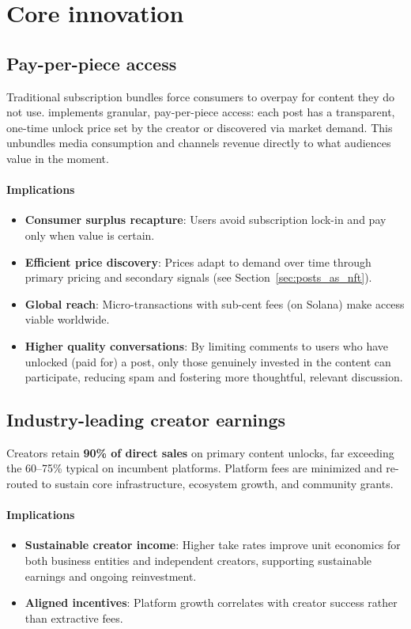 \documentclass[10pt]{article}
\begin{document}
  \section{Core innovation}
    \subsection{Pay-per-piece access}
      Traditional subscription bundles force consumers to overpay for content they do not use. \textbf{\projectname{}} implements granular, pay-per-piece access: each post has a transparent, one-time unlock price set by the creator or discovered via market demand. This unbundles media consumption and channels revenue directly to what audiences value in the moment.

      \paragraph{Implications}
        \begin{itemize}[leftmargin=*]
          \item \textbf{Consumer surplus recapture}: Users avoid subscription lock-in and pay only when value is certain.
          \item \textbf{Efficient price discovery}: Prices adapt to demand over time through primary pricing and secondary signals (see Section~\ref{sec:posts_as_nft}).
          \item \textbf{Global reach}: Micro-transactions with sub-cent fees (on Solana) make access viable worldwide.
          \item \textbf{Higher quality conversations}: By limiting comments to users who have unlocked (paid for) a post, only those genuinely invested in the content can participate, reducing spam and fostering more thoughtful, relevant discussion.
        \end{itemize}

    \subsection{Industry-leading creator earnings}
      Creators retain \textbf{90\% of direct sales} on primary content unlocks, far exceeding the 60--75\% typical on incumbent platforms. Platform fees are minimized and re-routed to sustain core infrastructure, ecosystem growth, and community grants.

      \paragraph{Implications}
        \begin{itemize}[leftmargin=*]
          \item \textbf{Sustainable creator income}: Higher take rates improve unit economics for both business entities and independent creators, supporting sustainable earnings and ongoing reinvestment.
          \item \textbf{Aligned incentives}: Platform growth correlates with creator success rather than extractive fees.
        \end{itemize}
\end{document}
